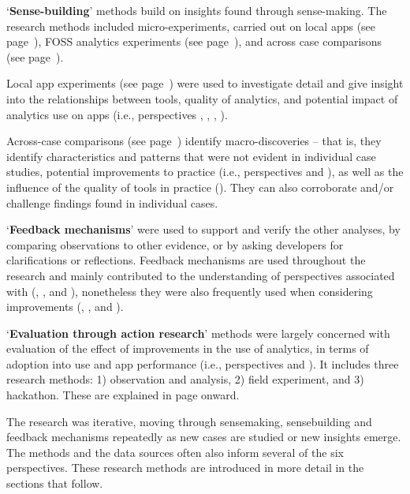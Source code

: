 `\textbf{Sense-building}' methods build on insights found through sense-making. The research methods included micro-experiments, carried out on local apps (see page~\pageref{local-app-experiments-research-method}), FOSS analytics experiments (see page~\pageref{foss-contributions-research-methods}), and across case comparisons (see page~\pageref{across-case-comparisons-research-method}).

Local app experiments (see page~\pageref{local-app-experiments-research-method}) were used to investigate detail and give insight into the relationships between tools, quality of analytics, and potential impact of analytics use on apps (i.e., perspectives \uartefacts, \utools, \iartefacts, \itools).

Across-case comparisons (see page~\pageref{across-case-comparisons-research-method}) identify macro-discoveries -- that is, they identify characteristics and patterns that were not evident in individual case studies, potential improvements to practice (i.e., perspectives \uuse and \iuse), as well as the influence of the quality of tools in practice (\itools). They can also corroborate and/or challenge findings found in individual cases.


`\textbf{Feedback mechanisms}' were used to support and verify the other analyses, by comparing observations to other evidence, or by asking developers for clarifications or reflections. Feedback mechanisms are used throughout the research and mainly contributed to the understanding of perspectives associated with (\uuse, \uartefacts, and \utools), nonetheless they were also frequently used when considering improvements (\iuse, \iartefacts, and \itools). 

`\textbf{Evaluation through action research}' methods were largely concerned with evaluation of the effect of improvements in the use of analytics, in terms of adoption into use and app performance (i.e., perspectives \iuse and \iartefacts). It includes three research methods: 1) observation and analysis, 2) field experiment, and 3) hackathon. These are explained in page \pageref{section-evaluation-through-action-research-method} onward. 

The research was iterative, moving through sensemaking, sensebuilding and feedback mechanisms repeatedly as new cases are studied or new insights emerge.  The methods and the data sources often also inform several of the six perspectives.  These research methods are introduced in more detail in the sections that follow.

